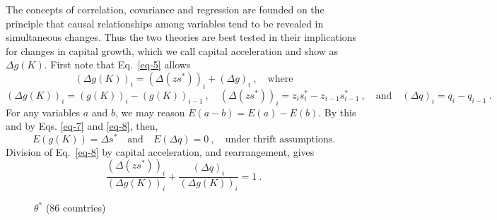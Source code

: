 \documentclass[a4paper,fleqn]{latex_styles/cas-sc}
\begin{document}
The concepts of correlation, covariance and regression are founded on the principle that causal relationships among variables tend to be revealed in simultaneous changes. Thus the two theories are best tested in their
implications for changes in capital growth, which we call capital acceleration and show as $\Delta g(K)$. First note that Eq.~\eqref{eq-5} allows
%
\begin{equation}
    (\Delta g (K))_{i} = (\Delta(z s^*))_{i} + (\Delta g)_{i}\ , \quad \text{where}\label{eq-8}
\end{equation}
%
\[(\Delta g{(K)})_{i} = (g{(K)})_{i} - (g(K))_{i - 1} \ , \quad
     (\Delta (z s^{*}))_{i} = z_i s^{*}_{i} - z_{i-1} s^{*}_{i - 1} \ , \quad \text{and} \quad
(\Delta q)_{i} = q_{i} - q_{i - 1} \ .\]
%
For any variables \(a\) and \(b\), we may reason
\(E(a - b) = E(a) - E(b)\). By this and by Eqs. \eqref{eq-7} and
\eqref{eq-8}, then,
%
\begin{equation}
    E(g(K)) = \Delta s^* \quad \text{and} \quad E(\Delta q) = 0\ , \quad \text{under thrift assumptions.}\label{eq-9}
\end{equation}
%
Division of Eq.~\eqref{eq-8} by capital acceleration, and rearrangement,
gives
%
\begin{equation}
\frac{(\Delta(z s^{*}))_{i}}{(\Delta g{(K)})_{i}} + \frac{(\Delta q)_{i}}{(\Delta g{(K)})_{i}} = 1 \ .\label{eq-10}
\end{equation}
%
\FloatBarrier
\begin{figure}[pos=H]
    \centering
    \captionsetup{justification=centering}
    \caption{\(\theta^*\) (86 countries)} %
    \label{fig-s_c_theta_plots}
\end{figure}
\end{document}
